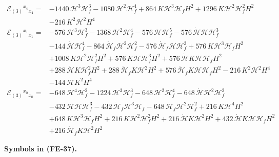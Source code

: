\documentclass[
  10pt,
]{article}
\begin{document}
\[
\begin{aligned}
\mathcal{E}_{(3)}{}^{x_4}{}_{x_4} ={}& -1440\,\mathcal{H}^{3}\mathcal{H}_f^{3} -
 1080\,\mathcal{H}^{2}\mathcal{H}_f^{4} + 864\,K\mathcal{H}^{3}\mathcal{H}_fH^{2} +
 1296\,K\mathcal{H}^{2}\mathcal{H}_f^{2}H^{2} \\
 &- 216\,K^{2}\mathcal{H}^{2}H^{4} \\
\mathcal{E}_{(3)}{}^{x_1}{}_{x_1} ={}& -576\,\mathcal{H}^{3}\mathcal{H}_f^{3} -
 1368\,\mathcal{H}^{2}\mathcal{H}_f^{4} - 576\,\mathcal{H}\mathcal{H}_f^{5} -
 576\,\dot{\mathcal{H}}\mathcal{H}\mathcal{H}_f^{3} \\
 &- 144\,\dot{\mathcal{H}}\mathcal{H}_f^{4} - 864\,\dot{\mathcal{H}}_f\mathcal{H}^{2}\mathcal{H}_f^{2} -
 576\,\dot{\mathcal{H}}_f\mathcal{H}\mathcal{H}_f^{3} + 576\,K\mathcal{H}^{3}\mathcal{H}_fH^{2} \\
 &+ 1008\,K\mathcal{H}^{2}\mathcal{H}_f^{2}H^{2} + 576\,K\mathcal{H}\mathcal{H}_f^{3}H^{2} +
 576\,\dot{\mathcal{H}}K\mathcal{H}\mathcal{H}_fH^{2} \\
 &+ 288\,\dot{\mathcal{H}}K\mathcal{H}_f^{2}H^{2} + 288\,\dot{\mathcal{H}}_fK\mathcal{H}^{2}H^{2} +
 576\,\dot{\mathcal{H}}_fK\mathcal{H}\mathcal{H}_fH^{2} - 216\,K^{2}\mathcal{H}^{2}H^{4} \\
 &- 144\,\dot{\mathcal{H}}K^{2}H^{4} \\
\mathcal{E}_{(3)}{}^{x_0}{}_{x_0} ={}& -648\,\mathcal{H}^{4}\mathcal{H}_f^{2} -
 1224\,\mathcal{H}^{3}\mathcal{H}_f^{3} - 648\,\mathcal{H}^{2}\mathcal{H}_f^{4} -
 648\,\dot{\mathcal{H}}\mathcal{H}^{2}\mathcal{H}_f^{2} \\
 &- 432\,\dot{\mathcal{H}}\mathcal{H}\mathcal{H}_f^{3} -
 432\,\dot{\mathcal{H}}_f\mathcal{H}^{3}\mathcal{H}_f -
 648\,\dot{\mathcal{H}}_f\mathcal{H}^{2}\mathcal{H}_f^{2} + 216\,K\mathcal{H}^{4}H^{2} \\
 &+ 648\,K\mathcal{H}^{3}\mathcal{H}_fH^{2} + 216\,K\mathcal{H}^{2}\mathcal{H}_f^{2}H^{2} +
 216\,\dot{\mathcal{H}}K\mathcal{H}^{2}H^{2} + 432\,\dot{\mathcal{H}}K\mathcal{H}\mathcal{H}_fH^{2} \\
 &+ 216\,\dot{\mathcal{H}}_fK\mathcal{H}^{2}H^{2}
\end{aligned} \tag{FE-37}
\]

\textbf{Symbols in (FE-37).}
\end{document}
